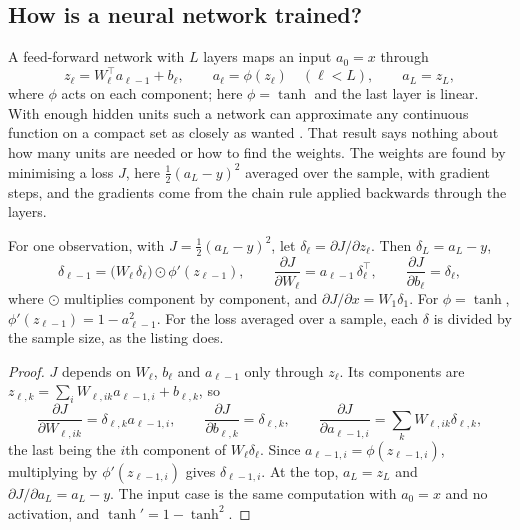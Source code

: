 \begin{chapterrefs}
\FloatBarrier
\section{How is a neural network trained?}
\label{sec12:nn}

A feed-forward network with $L$ layers maps an input $a_0=x$ through
\begin{equation}\label{eq12:mlp}
  z_\ell=W_\ell^\top a_{\ell-1}+b_\ell,\qquad a_\ell=\phi(z_\ell)\quad(\ell<L),\qquad a_L=z_L ,
\end{equation}
where $\phi$ acts on each component; here $\phi=\tanh$ and the last layer is linear. With enough hidden
units such a network can approximate any continuous function on a compact set as closely as wanted
\parencite{cybenko1989,hornik1991}. That result says nothing about how many units are needed or how to find
the weights. The weights are found by minimising a loss $J$, here $\tfrac12(a_L-y)^2$ averaged over the
sample, with gradient steps, and the gradients come from the chain rule applied backwards through the layers.

\begin{proposition}[Backpropagation]\label{prop12:backprop}
For one observation, with $J=\tfrac12(a_L-y)^2$, let $\delta_\ell=\partial J/\partial z_\ell$. Then $\delta_L=a_L-y$,
\begin{equation}\label{eq12:backprop}
  \delta_{\ell-1}=\bigl(W_\ell\,\delta_\ell\bigr)\odot\phi'(z_{\ell-1}),\qquad
  \frac{\partial J}{\partial W_\ell}=a_{\ell-1}\,\delta_\ell^\top,\qquad \frac{\partial J}{\partial b_\ell}=\delta_\ell ,
\end{equation}
where $\odot$ multiplies component by component, and $\partial J/\partial x=W_1\delta_1$. For $\phi=\tanh$,
$\phi'(z_{\ell-1})=1-a_{\ell-1}^2$. For the loss averaged over a sample, each $\delta$ is divided by the
sample size, as the listing does.
\end{proposition}

\begin{proof}
$J$ depends on $W_\ell$, $b_\ell$ and $a_{\ell-1}$ only through $z_\ell$. Its components are
$z_{\ell,k}=\sum_iW_{\ell,ik}a_{\ell-1,i}+b_{\ell,k}$, so
\[
  \frac{\partial J}{\partial W_{\ell,ik}}=\delta_{\ell,k}a_{\ell-1,i},\qquad
  \frac{\partial J}{\partial b_{\ell,k}}=\delta_{\ell,k},\qquad
  \frac{\partial J}{\partial a_{\ell-1,i}}=\sum_kW_{\ell,ik}\delta_{\ell,k},
\]
the last being the $i$th component of $W_\ell\delta_\ell$. Since $a_{\ell-1,i}=\phi(z_{\ell-1,i})$, multiplying by $\phi'(z_{\ell-1,i})$
gives $\delta_{\ell-1,i}$. At the top, $a_L=z_L$ and $\partial J/\partial a_L=a_L-y$. The input case is the same
computation with $a_0=x$ and no activation, and $\tanh'=1-\tanh^2$.
\end{proof}


\end{chapterrefs}
